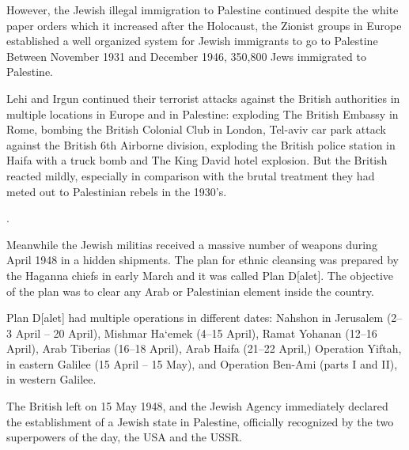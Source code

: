 However, the Jewish illegal immigration to Palestine continued despite the white paper orders which it increased after the Holocaust, the Zionist groups in Europe established a well organized system for Jewish immigrants to go to Palestine Between November 1931 and December 1946, 350,800 Jews immigrated to Palestine\citep{Grob-Fitzgibbon2011, Heller1995}.   

Lehi and Irgun continued their terrorist attacks against the British authorities in multiple locations in Europe and in Palestine: exploding The British Embassy in Rome, bombing the British Colonial Club in London, Tel-aviv car park attack against the British 6th Airborne division, exploding the British police station in Haifa with a truck bomb and The King David hotel explosion\citep{Bell1976}. But the British reacted mildly, especially in comparison with the brutal treatment they had meted out to Palestinian rebels in the 1930's\citep{Pappe2006}.
 
 
 
 
\cite[p.40]{Pappe2006}.
 
 Meanwhile the Jewish militias received a massive number of weapons during April 1948 in a hidden shipments\citep{Morris2008, Pappe2006}. The plan for ethnic cleansing was prepared by the Haganna chiefs in early March and it was called Plan D[alet]\citep{Shlaim2014}. The objective of the plan was to clear any Arab or Palestinian element inside the country\citep{Pappe2006, Shlaim2014}.
 
Plan D[alet] had multiple operations in different dates:
Nahshon in Jerusalem (2–3 April – 20 April),
Mishmar Ha‘emek (4–15 April),
Ramat Yohanan (12–16 April),
Arab Tiberias (16–18 April), 
Arab Haifa (21–22 April,)
Operation Yiftah, in eastern Galilee (15 April – 15 May), and
Operation Ben-Ami (parts I and II), in western Galilee\citep{Morris2004}.

The British left on 15 May 1948, and the Jewish Agency immediately
declared the establishment of a Jewish state in Palestine, officially recognized
by the two superpowers of the day, the USA and the USSR\citep{Pappe2006}.
 
